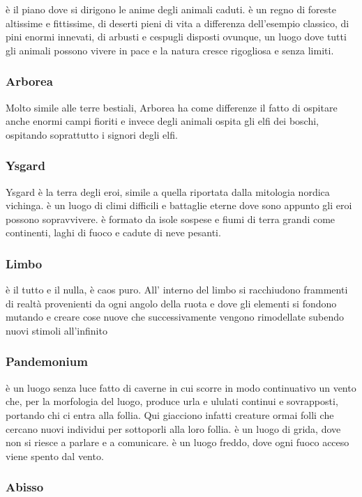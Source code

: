 \documentclass[a4paper,12pt]{book}
\begin{document}
è il piano dove si dirigono le anime degli animali caduti.
è un regno di foreste altissime e fittissime, di deserti pieni di vita a differenza dell'esempio classico, di pini enormi innevati, di arbusti e cespugli disposti ovunque, un luogo dove tutti gli animali possono vivere in pace e la natura cresce rigogliosa e senza limiti.

\subsubsection{Arborea}
Molto simile alle terre bestiali, Arborea ha come differenze il fatto di ospitare anche enormi campi fioriti e invece degli animali ospita gli elfi dei boschi, ospitando soprattutto i signori degli elfi.

\subsubsection{Ysgard}
Ysgard è la terra degli eroi, simile a quella riportata dalla mitologia nordica vichinga.
è un luogo di climi difficili e battaglie eterne dove sono appunto gli eroi possono sopravvivere.
è formato da isole sospese e fiumi di terra grandi come continenti, laghi di fuoco e cadute di neve pesanti.

\subsubsection{Limbo}

è il tutto e il nulla, è caos puro.
All' interno del limbo si racchiudono frammenti di realtà provenienti da ogni angolo della ruota e dove gli elementi si fondono mutando e creare cose nuove che successivamente vengono rimodellate subendo nuovi stimoli all'infinito

\subsubsection{Pandemonium}

è un luogo senza luce fatto di caverne in cui scorre in modo continuativo un vento che, per la morfologia del luogo, produce urla e ululati continui e sovrapposti, portando chi ci entra alla follia.
Qui giacciono infatti creature ormai folli che cercano nuovi individui per sottoporli alla loro follia.
è un luogo di grida, dove non si riesce a parlare e a comunicare.
è un luogo freddo, dove ogni fuoco acceso viene spento dal vento.

\subsubsection{Abisso}
\end{document}
